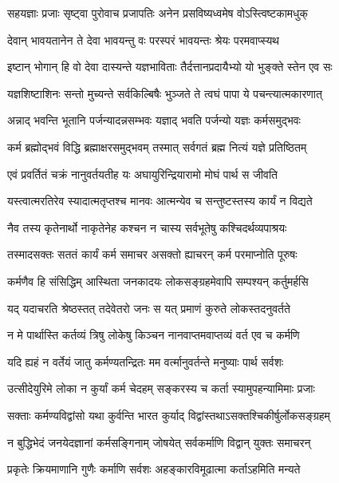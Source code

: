 \twolineshloka
{सहयज्ञाः प्रजाः सृष्ट्वा पुरोवाच प्रजापतिः}
{अनेन प्रसविष्यध्वमेष वोऽस्त्विष्टकामधुक्}%

\twolineshloka
{देवान् भावयतानेन ते देवा भावयन्तु वः}
{परस्परं भावयन्तः श्रेयः परमवाप्स्यथ}%

\twolineshloka
{इष्टान् भोगान् हि वो देवा दास्यन्ते यज्ञभाविताः}
{तैर्दत्तानप्रदायैभ्यो यो भुङ्क्ते स्तेन एव सः}%

\twolineshloka
{यज्ञशिष्टाशिनः सन्तो मुच्यन्ते सर्वकिल्बिषैः}
{भुञ्जते ते त्वघं पापा ये पचन्त्यात्मकारणात्}%

\twolineshloka
{अन्नाद् भवन्ति भूतानि पर्जन्यादन्नसम्भवः}
{यज्ञाद् भवति पर्जन्यो यज्ञः कर्मसमुद्भवः}%

\twolineshloka
{कर्म ब्रह्मोद्भवं विद्धि ब्रह्माक्षरसमुद्भवम्}
{तस्मात् सर्वगतं ब्रह्म नित्यं यज्ञे प्रतिष्ठितम्}%

\twolineshloka
{एवं प्रवर्तितं चक्रं नानुवर्तयतीह यः}
{अघायुरिन्द्रियारामो मोघं पार्थ स जीवति}%

\twolineshloka
{यस्त्वात्मरतिरेव स्यादात्मतृप्तश्च मानवः}
{आत्मन्येव च सन्तुष्टस्तस्य कार्यं न विद्यते}%

\twolineshloka
{नैव तस्य कृतेनार्थो नाकृतेनेह कश्चन}
{न चास्य सर्वभूतेषु कश्चिदर्थव्यपाश्रयः}%

\twolineshloka
{तस्मादसक्तः सततं कार्यं कर्म समाचर}
{असक्तो ह्याचरन् कर्म परमाप्नोति पूरुषः}%

\twolineshloka
{कर्मणैव हि संसिद्धिम् आस्थिता जनकादयः}
{लोकसङ्ग्रहमेवापि सम्पश्यन् कर्तुमर्हसि}%

\twolineshloka
{यद् यदाचरति श्रेष्ठस्तत् तदेवेतरो जनः}
{स यत् प्रमाणं कुरुते लोकस्तदनुवर्तते}%

\twolineshloka
{न मे पार्थास्ति कर्तव्यं त्रिषु लोकेषु किञ्चन}
{नानवाप्तमवाप्तव्यं वर्त एव च कर्मणि}%

\twolineshloka
{यदि ह्यहं न वर्तेयं जातु कर्मण्यतन्द्रितः}
{मम वर्त्मानुवर्तन्ते मनुष्याः पार्थ सर्वशः}%

\twolineshloka
{उत्सीदेयुरिमे लोका न कुर्यां कर्म चेदहम्}
{सङ्करस्य च कर्ता स्यामुपहन्यामिमाः प्रजाः}%

\twolineshloka
{सक्ताः कर्मण्यविद्वांसो यथा कुर्वन्ति भारत}
{कुर्याद् विद्वांस्तथाऽसक्तश्चिकीर्षुर्लोकसङ्ग्रहम्}%

\twolineshloka
{न बुद्धिभेदं जनयेदज्ञानां कर्मसङ्गिनाम्}
{जोषयेत् सर्वकर्माणि विद्वान् युक्तः समाचरन्}%

\twolineshloka
{प्रकृतेः क्रियमाणानि गुणैः कर्माणि सर्वशः}
{अहङ्कारविमूढात्मा कर्ताऽहमिति मन्यते}%

